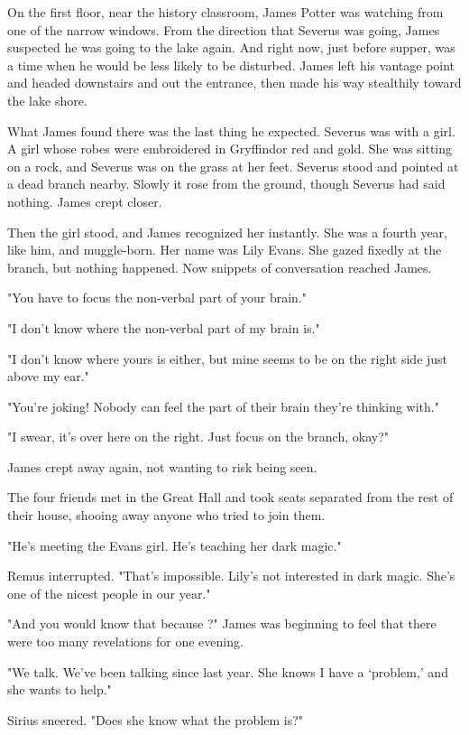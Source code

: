 On the first floor, near the history classroom, James Potter was watching from one of the narrow windows. From the direction that Severus was going, James suspected he was going to the lake again. And right now, just before supper, was a time when he would be less likely to be disturbed. James left his vantage point and headed downstairs and out the entrance, then made his way stealthily toward the lake shore.

What James found there was the last thing he expected. Severus was with a girl. A girl whose robes were embroidered in Gryffindor red and gold. She was sitting on a rock, and Severus was on the grass at her feet. Severus stood and pointed at a dead branch nearby. Slowly it rose from the ground, though Severus had said nothing. James crept closer.

Then the girl stood, and James recognized her instantly. She was a fourth year, like him, and muggle-born. Her name was Lily Evans. She gazed fixedly at the branch, but nothing happened. Now snippets of conversation reached James.

"You have to focus the non-verbal part of your brain."

"I don't know where the non-verbal part of my brain is."

"I don't know where yours is either, but mine seems to be on the right side just above my ear."

"You're joking! Nobody can feel the part of their brain they're thinking with."

"I swear, it's over here on the right. Just focus on the branch, okay?"

James crept away again, not wanting to risk being seen.

The four friends met in the Great Hall and took seats separated from the rest of their house, shooing away anyone who tried to join them.

"He's meeting the Evans girl. He's teaching her dark magic."

Remus interrupted. "That's impossible. Lily's not interested in dark magic. She's one of the nicest people in our year."

"And you would know that because{\el} ?" James was beginning to feel that there were too many revelations for one evening.

"We talk. We've been talking since last year. She knows I have a `problem,' and she wants to help."

Sirius sneered. "Does she know what the problem is?"

